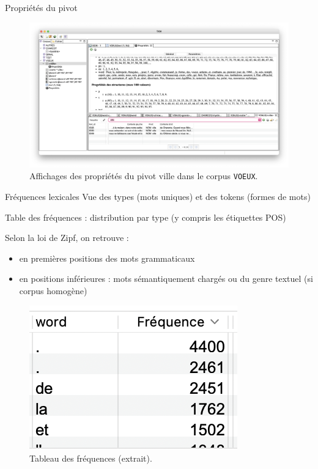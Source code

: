 \documentclass[xetex,xcolor={table,usenames,dvipsnames}]{beamer}
\begin{document}
\begin{frame}{Propriétés du pivot}
			\begin{figure}[h] %
		\centering
		\includegraphics[width=1\linewidth]{img/affichage_proprietes_pivot.png}
		\caption{Affichages des propriétés du pivot \og{}ville\fg{} dans le corpus \texttt{VOEUX}.}
		\label{fig:ling_out_TAL}
	\end{figure}
\end{frame}

\begin{frame}{Fréquences lexicales}
	Vue des types (mots uniques) et des tokens (formes de mots)
	
	Table des fréquences : distribution par type (y compris les étiquettes \textsc{POS})
	
	Selon la loi de Zipf, on retrouve :
	\begin{itemize}
		\item en premières positions des mots grammaticaux
		\item en positions inférieures : mots sémantiquement chargés ou du genre textuel (si corpus homogène)
	\end{itemize}

	\begin{figure}[h] %
		\centering
		\includegraphics[width=0.25\linewidth]{img/frequences.png}
		\caption{Tableau des fréquences (extrait).}
		\label{fig:ling_out_TAL}
	\end{figure}
\end{frame}
\end{document}
